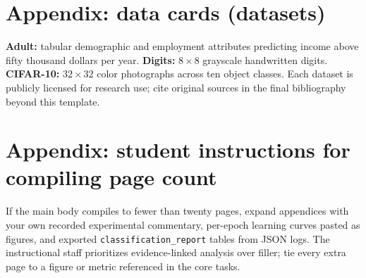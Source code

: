 \documentclass[11pt,a4paper]{article}
\begin{document}
\section{Appendix: data cards (datasets)}
\textbf{Adult:} tabular demographic and employment attributes predicting income above fifty thousand dollars per year. \textbf{Digits:} $8\times8$ grayscale handwritten digits. \textbf{CIFAR-10:} $32\times32$ color photographs across ten object classes. Each dataset is publicly licensed for research use; cite original sources in the final bibliography beyond this template.

\section{Appendix: student instructions for compiling page count}
If the main body compiles to fewer than twenty pages, expand appendices with your own recorded experimental commentary, per-epoch learning curves pasted as figures, and exported \texttt{classification\_report} tables from JSON logs. The instructional staff prioritizes evidence-linked analysis over filler; tie every extra page to a figure or metric referenced in the core tasks.
\end{document}
